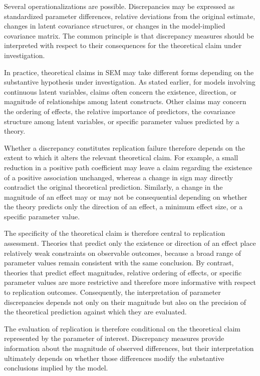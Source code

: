 \documentclass[
  12pt,
  letterpaper,
  man]{apa7}
\begin{document}
Several operationalizations are possible. Discrepancies may be expressed
as standardized parameter differences, relative deviations from the
original estimate, changes in latent covariance structures, or changes
in the model-implied covariance matrix. The common principle is that
discrepancy measures should be interpreted with respect to their
consequences for the theoretical claim under investigation.

In practice, theoretical claims in SEM may take different forms
depending on the substantive hypothesis under investigation. As stated
earlier, for models involving continuous latent variables, claims often
concern the existence, direction, or magnitude of relationships among
latent constructs. Other claims may concern the ordering of effects, the
relative importance of predictors, the covariance structure among latent
variables, or specific parameter values predicted by a theory.

Whether a discrepancy constitutes replication failure therefore depends
on the extent to which it alters the relevant theoretical claim. For
example, a small reduction in a positive path coefficient may leave a
claim regarding the existence of a positive association unchanged,
whereas a change in sign may directly contradict the original
theoretical prediction. Similarly, a change in the magnitude of an
effect may or may not be consequential depending on whether the theory
predicts only the direction of an effect, a minimum effect size, or a
specific parameter value.

The specificity of the theoretical claim is therefore central to
replication assessment. Theories that predict only the existence or
direction of an effect place relatively weak constraints on observable
outcomes, because a broad range of parameter values remain consistent
with the same conclusion. By contrast, theories that predict effect
magnitudes, relative ordering of effects, or specific parameter values
are more restrictive and therefore more informative with respect to
replication outcomes. Consequently, the interpretation of parameter
discrepancies depends not only on their magnitude but also on the
precision of the theoretical prediction against which they are
evaluated.

The evaluation of replication is therefore conditional on the
theoretical claim represented by the parameter of interest. Discrepancy
measures provide information about the magnitude of observed
differences, but their interpretation ultimately depends on whether
those differences modify the substantive conclusions implied by the
model.
\end{document}
